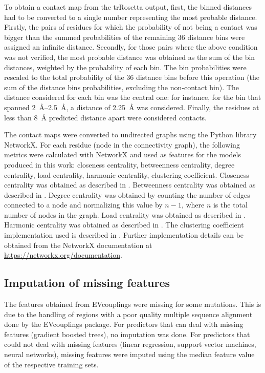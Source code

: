 To obtain a contact map from the trRosetta output, first, the binned distances had to be converted to a single number representing the most probable distance.
Firstly, the pairs of residues for which the probability of not being a contact was bigger than the summed probabilities of the remaining \num{36} distance bins were assigned an infinite distance.
Secondly, for those pairs where the above condition was not verified, the most probable distance was obtained as the sum of the bin distances, weighted by the probability of each bin.
The bin probabilities were rescaled to the total probability of the \num{36} distance bins before this operation (the sum of the distance bins probabilities, excluding the non-contact bin).
The distance considered for each bin was the central one: for instance, for the bin that spanned \SIrange{2}{2.5}{\angstrom}, a distance of \SI{2.25}{\angstrom} was considered.
Finally, the residues at less than \SI{8}{\angstrom} predicted distance apart were considered contacts.

The contact maps were converted to undirected graphs using the Python library NetworkX.
For each residue (node in the connectivity graph), the following metrics were calculated with NetworkX and used as features for the models produced in this work: closeness centrality, betweenness centrality, degree centrality, load centrality, harmonic centrality, clustering coefficient.
Closeness centrality was obtained as described in \textcite{Freeman1978}.
Betweenness centrality was obtained as described in \textcite{Brandes2001}.
Degree centrality was obtained by counting the number of edges connected to a node and normalizing this value by $n-1$, where $n$ is the total number of nodes in the graph.
Load centrality was obtained as described in \textcite{Newman2001}.
Harmonic centrality was obtained as described in \textcite{Boldi2014}.
The clustering coefficient implementation used is described in \textcite{Onnela2005}.
Further implementation details can be obtained from the NetworkX documentation at \url{https://networkx.org/documentation}.

\subsection{Imputation of missing features}\label{sec:mm_missing}
The features obtained from EVcouplings were missing for some mutations.
This is due to the handling of regions with a poor quality multiple sequence alignment done by the EVcouplings package.
For predictors that can deal with missing features (gradient boosted trees), no imputation was done.
For predictors that could not deal with missing features (linear regression, support vector machines, neural networks), missing features were imputed using the median feature value of the respective training sets.

